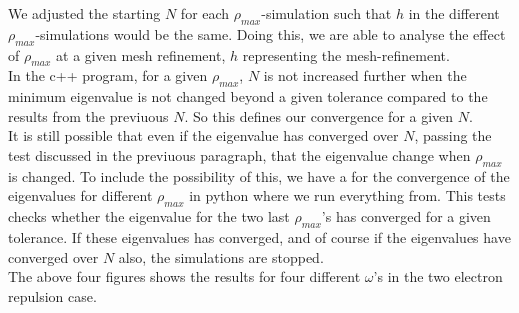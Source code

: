\documentclass{article}
\begin{document}
We adjusted the starting $N$ for each $\rho_{max}$-simulation such that $h$ in the different $\rho_{max}$-simulations would be the same. Doing this, we are able to analyse the effect of $\rho_{max}$ at a given mesh refinement, $h$ representing the mesh-refinement.\\

In the c++ program, for a given $\rho_{max}$, $N$ is not increased further when the minimum eigenvalue is not changed beyond a given tolerance compared to the results from the previuous $N$. So this defines our convergence for a given $N$. \\

It is still possible that even if the eigenvalue has converged over $N$, passing the test discussed in the previuous paragraph, that the eigenvalue change when $\rho_{max}$ is changed. To include the possibility of this, we have a for the convergence of the eigenvalues for different $\rho_{max}$ in python where we run everything from. This tests checks whether the eigenvalue for the two last $\rho_{max}$'s has converged for a given tolerance. If these eigenvalues has converged, and of course if the eigenvalues have converged over $N$ also, the simulations are stopped.\\

The above four figures shows the results for four different $\omega$'s in the two electron repulsion case.
\end{document}
